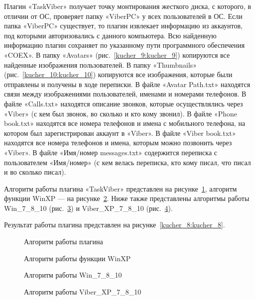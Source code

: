 Плагин «TaskViber» получает точку монтирования жесткого диска, с которого, в отличии от ОС, проверяет папку «ViberPC» у всех пользователей в ОС. Если папка «ViberPC» существует, то плагин извлекает информацию из аккаунтов, под которыми авторизовались с данного компьютера. Всю найденную информацию плагин сохраняет по указанному пути программного обеспечения «COEX». В папку «Avatars» (рис.~\ref{kucher_9:kucher_9}) копируются все найденные изображения пользователей. В папку «Thumbnails» (рис.~\ref{kucher_10:kucher_10}) копируются все изображения, которые были отправлены и получены в ходе переписки. В файле «Avatar Path.txt» находятся связи между изображениями пользователей, именами и номерами телефонов. В файле «Calls.txt» находятся описание звонков, которые осуществлялись через «Viber» (с кем был звонок, во сколько и кто кому звонил). В файле «Phone book.txt» находятся все номера телефонов и имена с мобильного телефона, на котором был зарегистрирован аккаунт в «Viber». В файле «Viber book.txt» находятся все номера телефонов и имена, которым можно позвонить через «Viber». В файле «Имя/номер messages.txt» содержится переписка с пользователем «Имя/номер» (с кем велась переписка, кто кому писал, что писал и во сколько писал).

Алгоритм работы плагина «TaskViber» представлен на рисунке~\ref{kucher_4:kucher_4}, алгоритм функции WinXP --- на рисунке~\ref{kucher_5:kucher_5}. Ниже также представлены алгоритмы работы Win\_7\_8\_10 (рис.~\ref{kucher_6:kucher_6}) и Viber\_XP\_7\_8\_10 (рис.~\ref{kucher_7:kucher_7}).

Результат работы плагина представлен на рисунке~\ref{kucher_8:kucher_8}.
 

\begin{figure}[h!]
\caption{ Алгоритм работы плагина }
\label{kucher_4:kucher_4}
\end{figure} 
  
\begin{figure}[h!]
\caption{ Алгоритм работы функции WinXP }
\label{kucher_5:kucher_5}
\end{figure} 

\begin{figure}[ht]
\caption{ Алгоритм работы Win\_7\_8\_10 }
\label{kucher_6:kucher_6}
\end{figure} 

\begin{figure}[h!]
\caption{ Алгоритм работы Viber\_XP\_7\_8\_10 }
\label{kucher_7:kucher_7}
\end{figure} 

